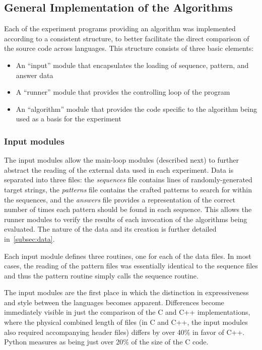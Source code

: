 \subsection{General Implementation of the Algorithms}

Each of the experiment programs providing an algorithm was implemented according to a consistent structure, to better facilitate the direct comparison of the source code across languages. This structure consists of three basic elements:

\begin{itemize}
\item An ``input'' module that encapsulates the loading of sequence, pattern, and answer data
\item A ``runner'' module that provides the controlling loop of the program
\item An ``algorithm'' module that provides the code specific to the algorithm being used as a basis for the experiment
\end{itemize}

\subsubsection{Input modules}

The input modules allow the main-loop modules (described next) to further abstract the reading of the external data used in each experiment. Data is separated into three files: the \textit{sequences} file contains lines of randomly-generated target strings, the \textit{patterns} file contains the crafted patterns to search for within the sequences, and the \textit{answers} file provides a representation of the correct number of times each pattern should be found in each sequence. This allows the runner modules to verify the results of each invocation of the algorithms being evaluated. The nature of the data and its creation is further detailed in~\ref{subsec:data}.

Each input module defines three routines, one for each of the data files. In most cases, the reading of the pattern files was essentially identical to the sequence files and thus the pattern routine simply calls the sequence routine.

The input modules are the first place in which the distinction in expressiveness and style between the languages becomes apparent. Differences become immediately visible in just the comparison of the C and C++ implementations, where the physical combined length of files (in C and C++, the input modules also required accompanying header files) differs by over 40\% in favor of C++. Python measures as being just over 20\% of the size of the C code.

